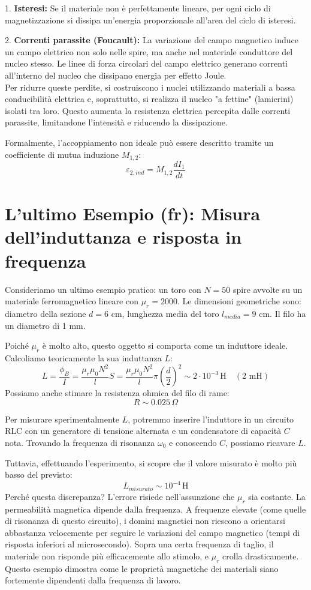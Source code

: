 \documentclass{book}
\begin{document}
1.  \textbf{Isteresi:} Se il materiale non è perfettamente lineare, per ogni ciclo di magnetizzazione si dissipa un'energia proporzionale all'area del ciclo di isteresi.

2.  \textbf{Correnti parassite (Foucault):} La variazione del campo magnetico induce un campo elettrico non solo nelle spire, ma anche nel materiale conduttore del nucleo stesso. Le linee di forza circolari del campo elettrico generano correnti all'interno del nucleo che dissipano energia per effetto Joule.
\\
Per ridurre queste perdite, si costruiscono i nuclei utilizzando materiali a bassa conducibilità elettrica e, soprattutto, si realizza il nucleo "a fettine" (lamierini) isolati tra loro. Questo aumenta la resistenza elettrica percepita dalle correnti parassite, limitandone l'intensità e riducendo la dissipazione.

Formalmente, l'accoppiamento non ideale può essere descritto tramite un coefficiente di mutua induzione $M_{1,2}$:
$$
\varepsilon_{2,ind}= M_{1,2} \frac{dI_1}{dt}
$$

\section{L'ultimo Esempio (fr): Misura dell'induttanza e risposta in frequenza}

Consideriamo un ultimo esempio pratico: un toro con $N=50$ spire avvolte su un materiale ferromagnetico lineare con $\mu_r=2000$.
Le dimensioni geometriche sono: diametro della sezione $d = 6$ cm, lunghezza media del toro $l_{media} = 9$ cm. Il filo ha un diametro di 1 mm.

Poiché $\mu_r$ è molto alto, questo oggetto si comporta come un induttore ideale. Calcoliamo teoricamente la sua induttanza $L$:
$$
L = \frac{\phi_B}{I} = \frac{\mu_r \mu_0 N^2}{l} S = \frac{\mu_r \mu_0 N^2}{l} \pi \left(\frac{d}{2}\right)^2 \sim 2 \cdot 10^{-3} \, \text{H} \quad (2 \text{ mH})
$$
Possiamo anche stimare la resistenza ohmica del filo di rame:
$$
R \sim 0.025 \, \Omega
$$

Per misurare sperimentalmente $L$, potremmo inserire l'induttore in un circuito RLC con un generatore di tensione alternata e un condensatore di capacità $C$ nota. Trovando la frequenza di risonanza $\omega_0$ e conoscendo $C$, possiamo ricavare $L$.

Tuttavia, effettuando l'esperimento, si scopre che il valore misurato è molto più basso del previsto:
$$
L_{misurato} \sim 10^{-4} \, \text{H}
$$
Perché questa discrepanza?
L'errore risiede nell'assunzione che $\mu_r$ sia costante. La permeabilità magnetica dipende dalla frequenza. A frequenze elevate (come quelle di risonanza di questo circuito), i domini magnetici non riescono a orientarsi abbastanza velocemente per seguire le variazioni del campo magnetico (tempi di risposta inferiori al microsecondo).
Sopra una certa frequenza di taglio, il materiale non risponde più efficacemente allo stimolo, e $\mu_r$ crolla drasticamente. Questo esempio dimostra come le proprietà magnetiche dei materiali siano fortemente dipendenti dalla frequenza di lavoro.
\end{document}
